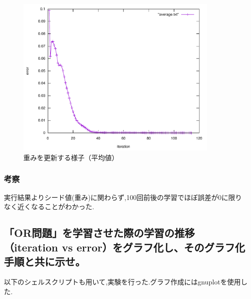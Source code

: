 \begin{figure}[h]
 \begin{center}
  \includegraphics[width=10.0cm]{figs/average.pdf}
  \caption{重みを更新する様子（平均値）}
  \label{fig:level1-2}
 \end{center}
\end{figure}


\subsubsection{考察}
実行結果よりシード値(重み)に関わらず,100回前後の学習でほぼ誤差が0に限りなく近くなることがわかった.

\subsection{「OR問題」を学習させた際の学習の推移（iteration vs error）をグラフ化し、そのグラフ化手順と共に示せ。}

以下のシェルスクリプトも用いて,実験を行った.グラフ作成にはgnuplotを使用した.









